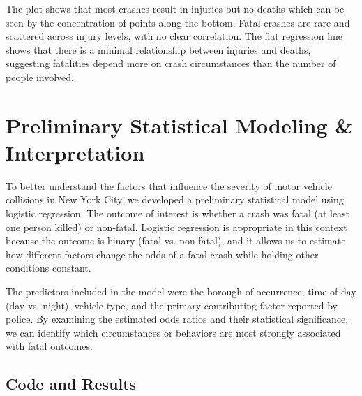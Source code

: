\documentclass[10pt]{article}\usepackage[]{graphicx}\usepackage[]{xcolor}
\begin{document}
The plot shows that most crashes result in injuries but no deaths which can be seen by the concentration of points along the bottom. Fatal crashes are rare and scattered across injury levels, with no clear correlation. The flat regression line shows that there is a minimal relationship between injuries and deaths, suggesting fatalities depend more on crash circumstances than the number of people involved.



\section{Preliminary Statistical Modeling \& Interpretation}

To better understand the factors that influence the severity of motor vehicle collisions in New York City, we developed a preliminary statistical model using logistic regression. The outcome of interest is whether a crash was fatal (at least one person killed) or non-fatal. Logistic regression is appropriate in this context because the outcome is binary (fatal vs. non-fatal), and it allows us to estimate how different factors change the odds of a fatal crash while holding other conditions constant.

The predictors included in the model were the borough of occurrence, time of day (day vs. night), vehicle type, and the primary contributing factor reported by police. By examining the estimated odds ratios and their statistical significance, we can identify which circumstances or behaviors are most strongly associated with fatal outcomes.

\subsection{Code and Results}
\end{document}
